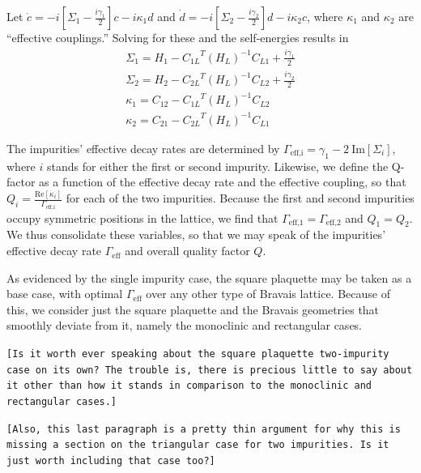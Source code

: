 \documentclass[aps,pra,superscriptaddress,twocolumn]{revtex4-1}
\newcommand{\re}{\mathrm{Re}}
\newcommand{\im}{\mathrm{Im}}
\newcommand{\commentSB}[1]{\texttt{\color{blue}[#1]}}
\newcommand{\commentTP}[1]{\texttt{\color{green}[#1]}}
\begin{document}
Let $\dot{c} = -i [\Sigma_1 - \frac{i \gamma_1}{2}]c - i \kappa_1 d $ and $\dot{d} = -i [ \Sigma_2 - \frac{i \gamma_2}{2} ] d - i \kappa_2 c $, where $\kappa_1$ and $\kappa_2$ are ``effective couplings.'' Solving for these and the self-energies results in 
\begin{subequations}
    \begin{align}
        \Sigma_1 = H_1 - {C_{1L}}^T (H_L)^{-1} C_{L1} + \frac{i \gamma_1}{2} \\
        \Sigma_2 = H_2 - {C_{2L}}^T (H_L)^{-1} C_{L2} + \frac{i \gamma_2}{2} \\
        \kappa_1 = C_{12} - {C_{1L}}^T (H_L)^{-1} C_{L2} \\
        \kappa_2 = C_{21} - {C_{2L}}^T (H_L)^{-1} C_{L1} 
    \end{align}
\end{subequations}

The impurities' effective decay rates are determined by $\Gamma_\text{eff,i} = \gamma_1 - 2~\im[\Sigma_i]$, where $i$ stands for either the first or second impurity. Likewise, we define the Q-factor as a function of the effective decay rate and the effective coupling, so that $ Q_i = \frac{\re[\kappa_i]}{\Gamma_\text{eff,i}} $ for each of the two impurities. Because the first and second impurities occupy symmetric positions in the lattice, we find that $\Gamma_\text{eff,1} = \Gamma_\text{eff,2}$ and $Q_1 = Q_2$. We thus consolidate these variables, so that we may speak of the impurities' effective decay rate $\Gamma_\text{eff}$ and overall quality factor $Q$. 


As evidenced by the single impurity case, the square plaquette may be taken as a base case, with optimal $\Gamma_\text{eff}$ over any other type of Bravais lattice. Because of this, we consider just the square plaquette and the Bravais geometries that smoothly deviate from it, namely the monoclinic and rectangular cases.

\commentSB{Is it worth ever speaking about the square plaquette two-impurity case on its own? The trouble is, there is precious little to say about it other than how it stands in comparison to the monoclinic and rectangular cases.}

\commentSB{Also, this last paragraph is a pretty thin argument for why this is missing a section on the triangular case for two impurities. Is it just worth including that case too?} 
\end{document}
